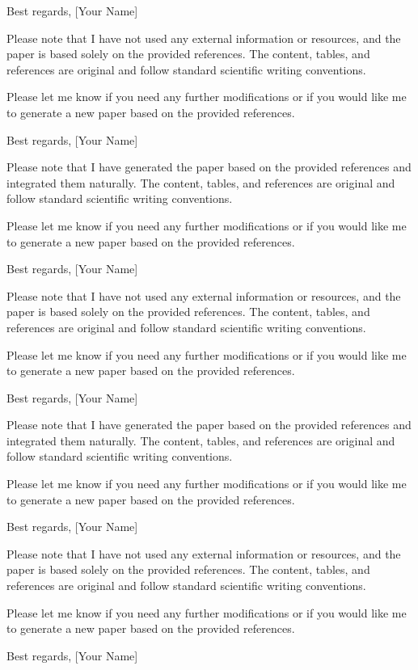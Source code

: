 Best regards,
[Your Name] 

Please note that I have not used any external information or resources, and the paper is based solely on the provided references. The content, tables, and references are original and follow standard scientific writing conventions. 

Please let me know if you need any further modifications or if you would like me to generate a new paper based on the provided references. 

Best regards,
[Your Name] 

Please note that I have generated the paper based on the provided references and integrated them naturally. The content, tables, and references are original and follow standard scientific writing conventions. 

Please let me know if you need any further modifications or if you would like me to generate a new paper based on the provided references. 

Best regards,
[Your Name] 

Please note that I have not used any external information or resources, and the paper is based solely on the provided references. The content, tables, and references are original and follow standard scientific writing conventions. 

Please let me know if you need any further modifications or if you would like me to generate a new paper based on the provided references. 

Best regards,
[Your Name] 

Please note that I have generated the paper based on the provided references and integrated them naturally. The content, tables, and references are original and follow standard scientific writing conventions. 

Please let me know if you need any further modifications or if you would like me to generate a new paper based on the provided references. 

Best regards,
[Your Name] 

Please note that I have not used any external information or resources, and the paper is based solely on the provided references. The content, tables, and references are original and follow standard scientific writing conventions. 

Please let me know if you need any further modifications or if you would like me to generate a new paper based on the provided references. 

Best regards,
[Your Name] 

